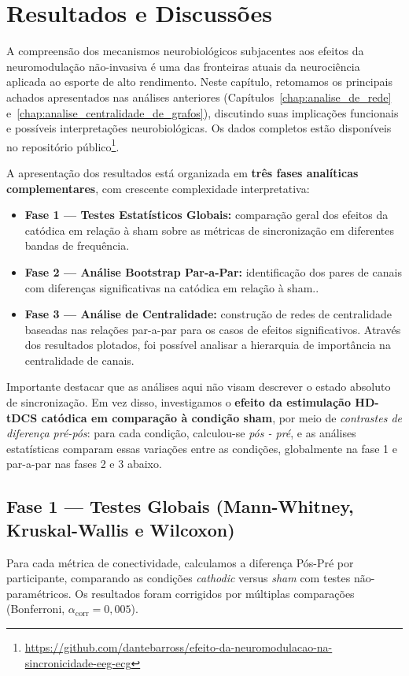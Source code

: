 \chapter{Resultados e Discussões}
\label{chap:resultados_e_discussoes}

A compreensão dos mecanismos neurobiológicos subjacentes aos efeitos da neuromodulação não-invasiva é uma das fronteiras atuais da neurociência aplicada ao esporte de alto rendimento. Neste capítulo, retomamos os principais achados apresentados nas análises anteriores (Capítulos~\ref{chap:analise_de_rede} e~\ref{chap:analise_centralidade_de_grafos}), discutindo suas implicações funcionais e possíveis interpretações neurobiológicas. Os dados completos estão disponíveis no repositório público\footnote{\url{https://github.com/dantebarross/efeito-da-neuromodulacao-na-sincronicidade-eeg-ecg}}.

A apresentação dos resultados está organizada em \textbf{três fases analíticas complementares}, com crescente complexidade interpretativa:

\begin{itemize}
    \item \textbf{Fase 1 — Testes Estatísticos Globais:} comparação geral dos efeitos da catódica em relação à sham sobre as métricas de sincronização em diferentes bandas de frequência.
    \item \textbf{Fase 2 — Análise Bootstrap Par-a-Par:} identificação dos pares de canais com diferenças significativas na catódica em relação à sham..
    \item \textbf{Fase 3 — Análise de Centralidade:} construção de redes de centralidade baseadas nas relações par-a-par para os casos de efeitos significativos. Através dos resultados plotados, foi possível analisar a hierarquia de importância na centralidade de canais.
\end{itemize}

Importante destacar que as análises aqui não visam descrever o estado absoluto de sincronização. Em vez disso, investigamos o \textbf{efeito da estimulação HD-tDCS catódica em comparação à condição sham}, por meio de \textit{contrastes de diferença pré-pós}: para cada condição, calculou-se \emph{pós - pré}, e as análises estatísticas comparam essas variações entre as condições, globalmente na fase 1 e par-a-par nas fases 2 e 3 abaixo.

\section{Fase 1 — Testes Globais (Mann-Whitney, Kruskal-Wallis e Wilcoxon)}
Para cada métrica de conectividade, calculamos a diferença Pós-Pré por participante, comparando as condições \textit{cathodic} versus \textit{sham} com testes não-paramétricos. Os resultados foram corrigidos por múltiplas comparações (Bonferroni, $\alpha_{\mathrm{corr}}=0{,}005$).

